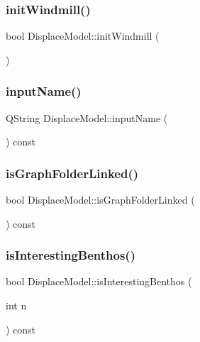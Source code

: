 \subsubsection{\texorpdfstring{initWindmill()}{initWindmill()}}
{\footnotesize\ttfamily bool Displace\+Model\+::init\+Windmill (\begin{DoxyParamCaption}{ }\end{DoxyParamCaption})\hspace{0.3cm}{\ttfamily [protected]}}

\mbox{\label{class_displace_model_ace9000588aa6ac9fa1d80eb0b1dedd3a}} 
\subsubsection{\texorpdfstring{inputName()}{inputName()}}
{\footnotesize\ttfamily Q\+String Displace\+Model\+::input\+Name (\begin{DoxyParamCaption}{ }\end{DoxyParamCaption}) const\hspace{0.3cm}{\ttfamily [inline]}}

\mbox{\label{class_displace_model_a66a1f72c48fdb14d0ac6841f2228f10f}} 
\subsubsection{\texorpdfstring{isGraphFolderLinked()}{isGraphFolderLinked()}}
{\footnotesize\ttfamily bool Displace\+Model\+::is\+Graph\+Folder\+Linked (\begin{DoxyParamCaption}{ }\end{DoxyParamCaption}) const\hspace{0.3cm}{\ttfamily [inline]}}

\mbox{\label{class_displace_model_a6c80f60352add730ba0c0fd49e000ed7}} 
\subsubsection{\texorpdfstring{isInterestingBenthos()}{isInterestingBenthos()}}
{\footnotesize\ttfamily bool Displace\+Model\+::is\+Interesting\+Benthos (\begin{DoxyParamCaption}\item[{int}]{n }\end{DoxyParamCaption}) const\hspace{0.3cm}{\ttfamily [inline]}}

